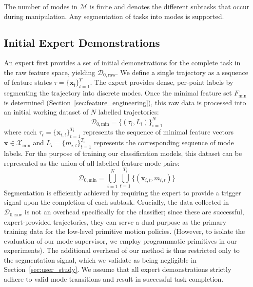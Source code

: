\documentclass[journal]{IEEEtran}
\begin{document}
The number of modes in $\mathcal{M}$ is finite and denotes the different subtasks that occur during manipulation. Any segmentation of tasks into modes is supported.

\subsection{Initial Expert Demonstrations}
An expert first provides a set of initial demonstrations for the complete task in the raw feature space, yielding $\mathcal{D}_{0,\text{raw}}$. We define a single trajectory as a sequence of feature states $\tau = \{\mathbf{x}_t\}_{t=1}^T$. The expert provides dense, per-point labels by segmenting the trajectory into discrete modes. Once the minimal feature set $F_{\text{min}}$ is determined (Section~\ref{sec:feature_engineering}), this raw data is processed into an initial working dataset of $N$ labelled trajectories:
\begin{equation}
\mathcal{D}_{0,\text{min}} = \{ (\tau_i, L_i) \}_{i=1}^N
\end{equation}
where each $\tau_i = \{\mathbf{x}_{i,t}\}_{t=1}^{T_i}$ represents the sequence of minimal feature vectors $\mathbf{x} \in \mathcal{X}_{\text{min}}$ and $L_i = \{m_{i,t}\}_{t=1}^{T_i}$ represents the corresponding sequence of mode labels. For the purpose of training our classification models, this dataset can be represented as the union of all labelled feature-mode pairs:
\begin{equation}
\mathcal{D}_{0,\text{min}} = \bigcup_{i=1}^{N} \bigcup_{t=1}^{T_i} \{ (\mathbf{x}_{i,t}, m_{i,t}) \}
\end{equation}
Segmentation is efficiently achieved by requiring the expert to provide a trigger signal upon the completion of each subtask. Crucially, the data collected in $\mathcal{D}_{0,\text{raw}}$ is not an overhead specifically for the classifier; since these are successful, expert-provided trajectories, they can serve a dual purpose as the primary training data for the low-level primitive motion policies. (However, to isolate the evaluation of our mode supervisor, we employ programmatic primitives in our experiments). The additional overhead of our method is thus restricted only to the segmentation signal, which we validate as being negligible in Section~\ref{sec:user_study}. We assume that all expert demonstrations strictly adhere to valid mode transitions and result in successful task completion.
\end{document}
